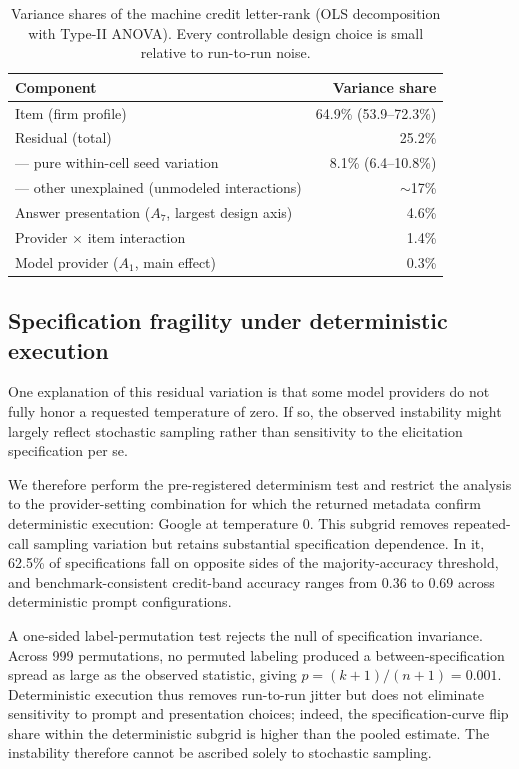 \documentclass[pdflatex,sn-nature,lineno]{sn-jnl}
\theoremstyle{thmstyleone}
\begin{document}
\begin{table}[t]\centering
\caption{Variance shares of the machine credit letter-rank (OLS decomposition with Type-II ANOVA). Every
controllable design choice is small relative to run-to-run noise.}\label{tab:var}
\begin{tabular}{lr}\toprule
Component & Variance share \\\midrule
Item (firm profile) & 64.9\% (53.9--72.3\%) \\
Residual (total) & 25.2\% \\
\quad --- pure within-cell seed variation & 8.1\% (6.4--10.8\%) \\
\quad --- other unexplained (unmodeled interactions) & $\sim$17\% \\
Answer presentation ($A_7$, largest design axis) & 4.6\% \\
Provider $\times$ item interaction & 1.4\% \\
Model provider ($A_1$, main effect) & 0.3\% \\\bottomrule
\end{tabular}\end{table}

\subsection{Specification fragility under deterministic execution}
One explanation of this residual variation is that some model providers do not fully honor a requested
temperature of zero. If so, the observed instability might largely reflect stochastic sampling rather
than sensitivity to the elicitation specification per se.

We therefore perform the pre-registered determinism test and restrict the analysis to the
provider-setting combination for which the returned metadata confirm deterministic execution: Google at
temperature 0. This subgrid removes repeated-call sampling variation but retains substantial
specification dependence. In it, 62.5\% of specifications fall on opposite sides of the majority-accuracy
threshold, and benchmark-consistent credit-band accuracy ranges from 0.36 to 0.69 across deterministic
prompt configurations.

A one-sided label-permutation test rejects the null of specification invariance. Across 999 permutations,
no permuted labeling produced a between-specification spread as large as the observed statistic, giving
$p=(k{+}1)/(n{+}1)=0.001$. Deterministic execution thus removes run-to-run jitter but does not eliminate
sensitivity to prompt and presentation choices; indeed, the specification-curve flip share within the
deterministic subgrid is higher than the pooled estimate. The instability therefore cannot be ascribed
solely to stochastic sampling.
\end{document}
